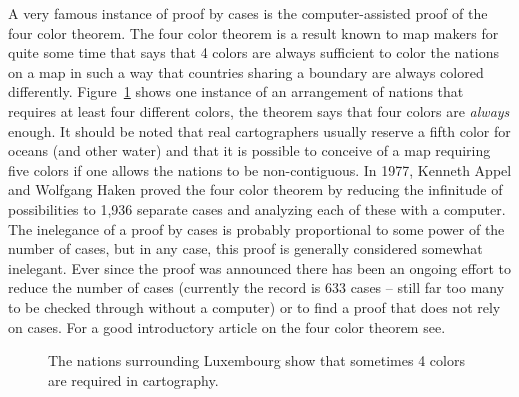 A very famous instance of proof by cases is the computer-assisted proof
of the 
four color theorem.  The four color theorem is a result known to
map makers for quite some time that says that 4 colors are always sufficient
to color the nations on a map in such a way that countries sharing a boundary
are always colored differently.  Figure~\ref{fig:Lux_map} shows one instance
of an arrangement of nations that requires at least four different colors, 
the theorem says that four colors are \emph{always} enough.  It should be noted
that real cartographers usually reserve a fifth color for oceans (and other 
water) and that it is possible to conceive of a map requiring five colors if 
one allows the nations to be non-contiguous.   In 1977, 
 Kenneth Appel and 
Wolfgang Haken proved the four color
theorem by reducing the infinitude of possibilities to 
1,936 separate cases and analyzing each of these with a computer.  
The inelegance of a proof by cases is probably proportional to some power of
the number of cases, but in any case, this proof is generally considered 
somewhat inelegant.  Ever since the proof was announced there has been an
ongoing effort to reduce the number of cases (currently the record is 633
cases -- still far too many to be checked through without a computer) or to
find a proof that does not rely on cases.  For a  good introductory article on
the four color theorem see\cite{wiki-4color}. 

\begin{figure}[!hbtp] 
\begin{center}

\end{center}
\caption[A four-color map.]{The nations surrounding %
 Luxembourg show %
that sometimes 4 colors are required in cartography.}
\label{fig:Lux_map}
\end{figure}

